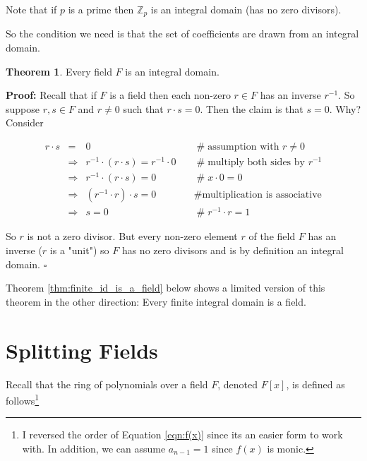 \documentclass[11pt, oneside]{article}   	%
\theoremstyle{definition}
\newtheorem{thm}{Theorem}[section]
\begin{document}
\bigskip
\noindent
Note that if $p$ is a prime then $\mathbb{Z}_{p}$ is an integral domain (has no zero divisors).

\bigskip
\noindent
So the condition we need is that the set of coefficients are drawn from an integral domain. 

\begin{thm}
Every field $F$ is an integral domain.
\label{thm:integral_domain}
\end{thm}

\noindent
\textbf{Proof:} Recall that if $F$ is a field then each non-zero $r \in F$ has an inverse $r^{-1}$. 
So suppose $r,s \in F$ and $r \neq 0$ such that $r \cdot s = 0$. Then the claim is that $s = 0$.
Why? Consider


\begin{equation}
\begin{array}{rcll} 
r \cdot s 
&=& 0                                                                                &\quad  \mathrel{\#} \text{assumption with $r \neq 0$}         \\
&\Rightarrow& r^{-1} \cdot (r \cdot s) = r^{-1} \cdot 0        &\quad  \mathrel{\#} \text{multiply both sides by $r^{-1}$}    \\
&\Rightarrow&  r^{-1} \cdot (r \cdot s) =  0                        &\quad  \mathrel{\#} x \cdot 0 = 0                                          \\
&\Rightarrow&  (r^{-1} \cdot r) \cdot s =  0                        &\quad  \mathrel{\#} \text{multiplication is associative}         \\
&\Rightarrow&  s = 0                                                         &\quad  \mathrel{\#} r^{-1} \cdot r = 1
\end{array}
\end{equation}

\bigskip
\noindent
So $r$ is not a zero divisor. But every non-zero element $r$ of the field $F$ has an inverse ($r$ is a "unit")
so $F$ has no zero divisors and is by definition an integral 
domain. $\square$

\bigskip
\noindent
Theorem \ref{thm:finite_id_is_a_field} below shows a limited version of this theorem in the other direction: 
Every finite integral domain is a field.

\section{Splitting Fields}
Recall that the ring of polynomials over a field $F$, denoted $F[x]$, is defined as follows\footnote{I reversed the order
of Equation \ref{eqn:f(x)} since its an easier form to work with. In addition, we can assume $a_{n-1} = 1$ since $f(x)$ 
is monic.}
\end{document}
